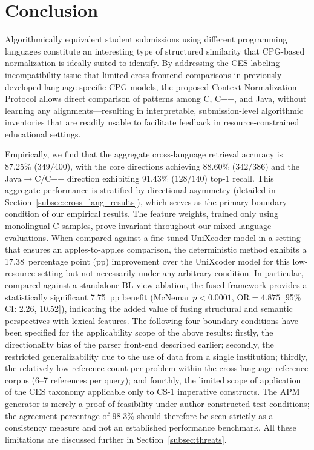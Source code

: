 \section{Conclusion}
\label{sec:conclusion}

Algorithmically equivalent student submissions using different programming languages constitute an interesting type of structured similarity that CPG-based normalization is ideally suited to identify. By addressing the CES labeling incompatibility issue that limited cross-frontend comparisons in previously developed language-specific CPG models, the proposed Context Normalization Protocol allows direct comparison of patterns among C, C++, and Java, without learning any alignments---resulting in interpretable, submission-level algorithmic inventories that are readily usable to facilitate feedback in resource-constrained educational settings.

Empirically, we find that the aggregate cross-language retrieval accuracy is 87.25\% ($349/400$), with the core directions achieving 88.60\% ($342/386$) and the Java$\rightarrow$C/C++ direction exhibiting 91.43\% ($128/140$) top-1 recall. This aggregate performance is stratified by directional asymmetry (detailed in Section~\ref{subsec:cross_lang_results}), which serves as the primary boundary condition of our empirical results. The feature weights, trained only using monolingual C samples, prove invariant throughout our mixed-language evaluations. When compared against a fine-tuned UniXcoder model in a setting that ensures an apples-to-apples comparison, the deterministic method exhibits a 17.38~percentage point (pp) improvement over the UniXcoder model for this low-resource setting but not necessarily under any arbitrary condition. In particular, compared against a standalone BL-view ablation, the fused framework provides a statistically significant 7.75~pp benefit (McNemar $p{<}0.0001$, OR$=4.875$ [95\% CI: 2.26, 10.52]), indicating the added value of fusing structural and semantic perspectives with lexical features.
The following four boundary conditions have been specified for the applicability scope of the above results: firstly, the directionality bias of the parser front-end described earlier; secondly, the restricted generalizability due to the use of data from a single institution; thirdly, the relatively low reference count per problem within the cross-language reference corpus (6–7 references per query); and fourthly, the limited scope of application of the CES taxonomy applicable only to CS-1 imperative constructs. The APM generator is merely a proof-of-feasibility under author-constructed test conditions; the agreement percentage of 98.3\% should therefore be seen strictly as a consistency measure and not an established performance benchmark. All these limitations are discussed further in Section~\ref{subsec:threats}.

